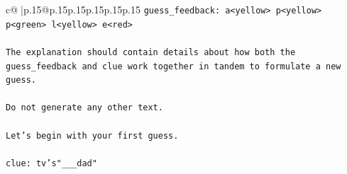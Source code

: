 \documentclass{article}
\begin{document}
{\begin{supertabular}{c@{$\;$}|p{.15\linewidth}@{}p{.15\linewidth}p{.15\linewidth}p{.15\linewidth}p{.15\linewidth}p{.15\linewidth}}
{{{\texttt{guess\_feedback: a<yellow> p<yellow> p<green> l<yellow> e<red>} \\
\\ 
\texttt{The explanation should contain details about how both the guess\_feedback and clue work together in tandem to formulate a new guess.} \\
\\ 
\texttt{Do not generate any other text.} \\
\\ 
\texttt{Let's begin with your first guess.} \\
\\ 
\texttt{clue: tv's"\_\_\_dad"} \\
            }
        }
    }
     \\ \\


\end{supertabular}}
\end{document}
